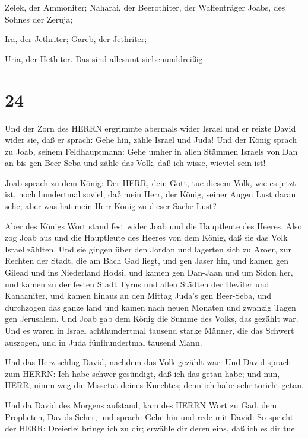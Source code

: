  Zelek, der Ammoniter; Naharai, der Beerothiter, der
Waffenträger Joabs, des Sohnes der Zeruja;

 Ira, der Jethriter; Gareb, der Jethriter;

 Uria, der Hethiter. Das sind allesamt siebenunddreißig.

\hypertarget{section-23}{%
\section{24}\label{section-23}}

 Und der Zorn des HERRN ergrimmte abermals wider Israel und
er reizte David wider sie, daß er sprach: Gehe hin, zähle Israel und
Juda!  Und der König sprach zu Joab, seinem Feldhauptmann:
Gehe umher in allen Stämmen Israels von Dan an bis gen Beer-Seba und
zähle das Volk, daß ich wisse, wieviel sein ist!

 Joab sprach zu dem König: Der HERR, dein Gott, tue diesem
Volk, wie es jetzt ist, noch hundertmal soviel, daß mein Herr, der
König, seiner Augen Lust daran sehe; aber was hat mein Herr König zu
dieser Sache Lust?

 Aber des Königs Wort stand fest wider Joab und die
Hauptleute des Heeres. Also zog Joab aus und die Hauptleute des Heeres
von dem König, daß sie das Volk Israel zählten.  Und sie
gingen über den Jordan und lagerten sich zu Aroer, zur Rechten der
Stadt, die am Bach Gad liegt, und gen Jaser hin,  und kamen
gen Gilead und ins Niederland Hodsi, und kamen gen Dan-Jaan und um Sidon
her,  und kamen zu der festen Stadt Tyrus und allen Städten
der Heviter und Kanaaniter, und kamen hinaus an den Mittag Juda's gen
Beer-Seba,  und durchzogen das ganze land und kamen nach
neuen Monaten und zwanzig Tagen gen Jerusalem.  Und Joab gab
dem König die Summe des Volks, das gezählt war. Und es waren in Israel
achthundertmal tausend starke Männer, die das Schwert auszogen, und in
Juda fünfhundertmal tausend Mann.

 Und das Herz schlug David, nachdem das Volk gezählt war.
Und David sprach zum HERRN: Ich habe schwer gesündigt, daß ich das getan
habe; und nun, HERR, nimm weg die Missetat deines Knechtes; denn ich
habe sehr töricht getan.

 Und da David des Morgens aufstand, kam des HERRN Wort zu
Gad, dem Propheten, Davids Seher, und sprach:  Gehe hin und
rede mit David: So spricht der HERR: Dreierlei bringe ich zu dir;
erwähle dir deren eins, daß ich es dir tue.

